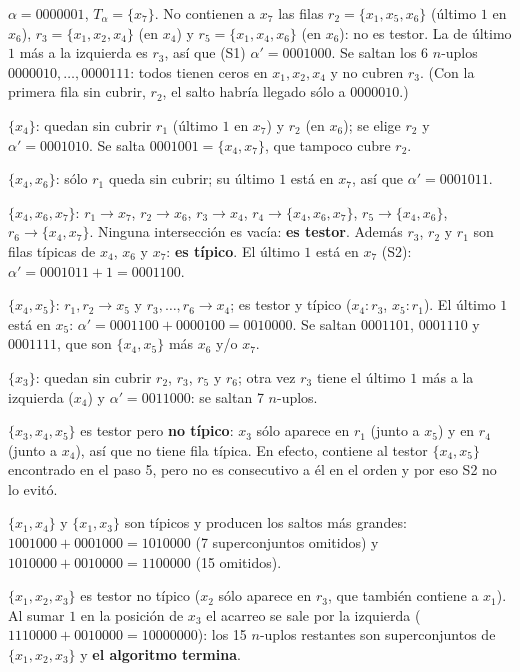 \documentclass[11pt, a4paper]{article}
\theoremstyle{definition}
\theoremstyle{plain}
\newcommand{\x}[1]{x_{#1}}
\newcommand{\cj}[1]{\{#1\}}
\begin{document}
\begin{description}[nosep, leftmargin=1.2em]
\item[Paso 1.] $\alpha=0000001$, $T_\alpha=\cj{\x7}$. No contienen a $\x7$ las filas
  $r_2=\cj{\x1,\x5,\x6}$ (último $1$ en $\x6$), $r_3=\cj{\x1,\x2,\x4}$ (en $\x4$) y
  $r_5=\cj{\x1,\x4,\x6}$ (en $\x6$): no es testor. La de último $1$ más a la
  izquierda es $r_3$, así que (S1) $\alpha'=0001000$. Se saltan los 6 $n$-uplos
  $0000010,\dots,0000111$: todos tienen ceros en $\x1,\x2,\x4$ y no cubren $r_3$.
  (Con la primera fila sin cubrir, $r_2$, el salto habría llegado sólo a $0000010$.)
\item[Paso 2.] $\cj{\x4}$: quedan sin cubrir $r_1$ (último $1$ en $\x7$) y $r_2$ (en
  $\x6$); se elige $r_2$ y $\alpha'=0001010$. Se salta $0001001=\cj{\x4,\x7}$, que
  tampoco cubre $r_2$.
\item[Paso 3.] $\cj{\x4,\x6}$: sólo $r_1$ queda sin cubrir; su último $1$ está en
  $\x7$, así que $\alpha'=0001011$.
\item[Paso 4.] $\cj{\x4,\x6,\x7}$: $r_1\to\x7$, $r_2\to\x6$, $r_3\to\x4$,
  $r_4\to\cj{\x4,\x6,\x7}$, $r_5\to\cj{\x4,\x6}$, $r_6\to\cj{\x4,\x7}$. Ninguna
  intersección es vacía: \textbf{es testor}. Además $r_3$, $r_2$ y $r_1$ son filas
  típicas de $\x4$, $\x6$ y $\x7$: \textbf{es típico}. El último $1$ está en $\x7$
  (S2): $\alpha'=0001011+1=0001100$.
\item[Paso 5.] $\cj{\x4,\x5}$: $r_1,r_2\to\x5$ y $r_3,\dots,r_6\to\x4$; es testor
  y típico ($\x4{:}r_3$, $\x5{:}r_1$). El último $1$ está en $\x5$:
  $\alpha'=0001100+0000100=0010000$. Se saltan $0001101$, $0001110$ y $0001111$,
  que son $\cj{\x4,\x5}$ más $\x6$ y/o $\x7$.
\item[Paso 6.] $\cj{\x3}$: quedan sin cubrir $r_2$, $r_3$, $r_5$ y $r_6$; otra vez
  $r_3$ tiene el último $1$ más a la izquierda ($\x4$) y $\alpha'=0011000$: se saltan
  7 $n$-uplos.
\item[Paso 9.] $\cj{\x3,\x4,\x5}$ es testor pero \textbf{no típico}: $\x3$ sólo aparece
  en $r_1$ (junto a $\x5$) y en $r_4$ (junto a $\x4$), así que no tiene fila típica.
  En efecto, contiene al testor $\cj{\x4,\x5}$ encontrado en el paso 5, pero no es
  consecutivo a él en el orden y por eso S2 no lo evitó.
\item[Pasos 35--36.] $\cj{\x1,\x4}$ y $\cj{\x1,\x3}$ son típicos y producen los
  saltos más grandes: $1001000+0001000=1010000$ (7 superconjuntos omitidos) y
  $1010000+0010000=1100000$ (15 omitidos).
\item[Paso 44.] $\cj{\x1,\x2,\x3}$ es testor no típico ($\x2$ sólo aparece en $r_3$,
  que también contiene a $\x1$). Al sumar $1$ en la posición de $\x3$ el acarreo se
  sale por la izquierda ($1110000+0010000=10000000$): los 15 $n$-uplos restantes
  son superconjuntos de $\cj{\x1,\x2,\x3}$ y \textbf{el algoritmo termina}.
\end{description}
\end{document}
